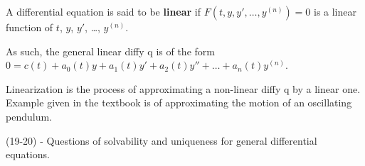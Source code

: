 \documentclass[../../diff_eqs.tex]{subfiles}
\begin{document}
\begin{definition}[Linearity]
    A differential equation is said to be \textbf{linear} if $F(t, y, y', \dots, y^{(n)}) = 0$ is a linear function of $t$, $y$, $y'$, \dots, $y^{(n)}$. 

    As such, the general linear diffy q is of the form $0 = c(t) + a_0(t)y + a_1(t)y' + a_2(t)y'' + \dots + a_n(t)y^{(n)}$. \\
\end{definition}

\begin{definition}[Linearization]
    Linearization is the process of approximating a non-linear diffy q by a linear one. Example given in the textbook is of approximating the motion of an oscillating pendulum.
\end{definition}

(19-20) - Questions of solvability and uniqueness for general differential equations. 
\end{document}
